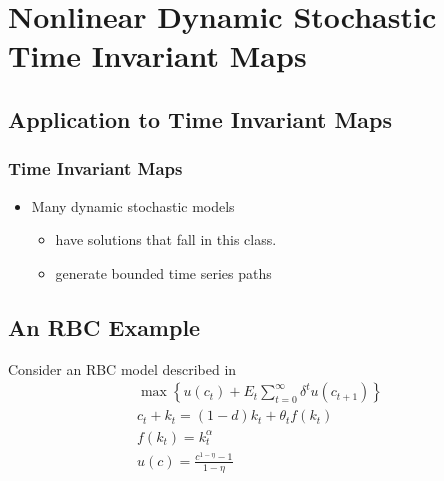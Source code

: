 \documentclass[notheorems]{beamer}
\begin{document}
\section{Nonlinear Dynamic Stochastic Time Invariant Maps}
\label{sec:extToMaps}



\subsection{Application to Time Invariant Maps}


\begin{frame}
  \frametitle{Time Invariant Maps}


  \begin{itemize}
\item  Many dynamic stochastic models 
  \begin{itemize}
  \item  have solutions that fall in this class.
\item  generate  bounded time series paths 
  \end{itemize}
  \end{itemize}



\subsection{An RBC Example}
\label{sec:rbcaux}
Consider an RBC  model described in \cite{Maliar2005}
 \begin{gather*}
   \max\left \{  u(c_t) + E_t \sum_{t=0}^\infty  \delta^{t}u(c_{t+1})\right \}\\
c_t + k_t=(1-d)k_t + \theta_t f(k_t)\\
f(k_t)= k_t^\alpha\\
u(c)=\frac{c^{1-\eta}-1}{1-\eta}
 \end{gather*}
 \end{frame}
\end{document}
